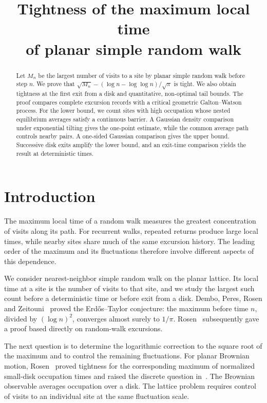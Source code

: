 \documentclass[11pt,a4paper]{article}
\title{Tightness of the maximum local time\\of planar simple random walk}
\author{}
\date{}
\numberwithin{equation}{section}
\theoremstyle{remark}
\begin{document}
\maketitle
\vspace{-2em}

\begin{abstract}
Let $M_n$ be the largest number of visits to a site by planar simple random walk before step $n$. We prove that $\sqrt{M_n}-(\log n-\log\log n)/\sqrt\pi$ is tight. We also obtain tightness at the first exit from a disk and quantitative, non-optimal tail bounds. The proof compares complete excursion records with a critical geometric Galton--Watson process. For the lower bound, we count sites with high occupation whose nested equilibrium averages satisfy a continuous barrier. A Gaussian density comparison under exponential tilting gives the one-point estimate, while the common average path controls nearby pairs. A one-sided Gaussian comparison gives the upper bound. Successive disk exits amplify the lower bound, and an exit-time comparison yields the result at deterministic times.
\end{abstract}

\section{Introduction}\label{sec:intro}
The maximum local time of a random walk measures the greatest concentration of visits along its path. For recurrent walks, repeated returns produce large local times, while nearby sites share much of the same excursion history. The leading order of the maximum and its fluctuations therefore involve different aspects of this dependence.

We consider nearest-neighbor simple random walk on the planar lattice. Its local time at a site is the number of visits to that site, and we study the largest such count before a deterministic time or before exit from a disk. Dembo, Peres, Rosen and Zeitouni~\cite{DPRZ} proved the Erd\H{o}s--Taylor conjecture: the maximum before time $n$, divided by $(\log n)^2$, converges almost surely to $1/\pi$. Rosen~\cite[Theorem 1.1]{ET} subsequently gave a proof based directly on random-walk excursions.

The next question is to determine the logarithmic correction to the square root of the maximum and to control the remaining fluctuations. For planar Brownian motion, Rosen~\cite[Theorem 1.1]{GW} proved tightness for the corresponding maximum of normalized small-disk occupation times and raised the discrete question in~\cite[Section 1.2]{GW}. The Brownian observable averages occupation over a disk. The lattice problem requires control of visits to an individual site at the same fluctuation scale.
\end{document}
